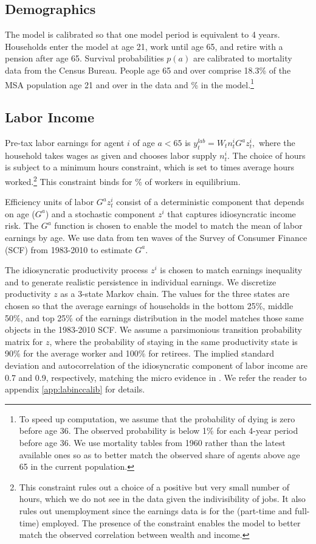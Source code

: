 \documentclass[letterpaper,12pt,dvipsnames,usenames]{article}
\theoremstyle{definition}
\begin{document}
\begin{spacing}{1.25}
\subsection{Demographics}
The model is calibrated so that one model period is equivalent to 4 years. Households enter the model at age 21, work until age 65, and retire with a pension after age 65. Survival probabilities $p(a)$ are calibrated to mortality data from the Census Bureau. People  age 65 and over comprise 18.3\% of the MSA population age 21 and over in the data and {\fracRet}\% in the model.\footnote{To speed up computation, we assume that the probability of dying is zero before age 36. The observed probability is below 1\% for each 4-year period before age 36. We use mortality tables from 1960 rather than the latest available ones so as to better match the observed share of agents above age 65 in the current population.}

\subsection{Labor Income}

Pre-tax labor earnings for agent $i$ of age $a<65$ is $y_t^{lab}= W_t n_t^i G^a z_t^i,$ where the household takes wages as given and chooses labor supply $n_t^i$. The choice of hours is subject to a minimum hours constraint, which is set to  {\HoursMinbyHours} times average hours worked.\footnote{This constraint rules out a choice of a positive but very small number of hours, which we do not see in the data given the indivisibility of jobs. It also rules out unemployment since the earnings data is for the (part-time and full-time) employed. The presence of the constraint enables the model to better match the observed correlation between wealth and income.} This constraint binds for {\HoursMinBind}\% of workers in equilibrium.


Efficiency units of labor $G^a z_t^i$ consist of a deterministic component that depends on age ($G^a$) and a stochastic component $z^i$ that captures idiosyncratic income risk. The $G^{a}$ function is chosen to enable the model to match the mean of labor earnings by age. We use data from ten waves of the Survey of Consumer Finance (SCF) from 1983-2010 to estimate $G^a$.

The idiosyncratic productivity process $z^i$ is chosen to match earnings inequality and to generate realistic persistence in individual earnings. We discretize productivity $z$ as a 3-state Markov chain. The values for the three states are chosen so that the average earnings of households in the bottom 25\%, middle 50\%, and top 25\% of the earnings distribution in the model matches those same objects in the 1983-2010 SCF. We assume a parsimonious transition probability matrix for $z$, where the probability of staying in the same productivity state is 90\% for the average worker and 100\% for retirees. The implied standard deviation and autocorrelation of the idiosyncratic component of labor income are 0.7 and 0.9, respectively, matching the micro evidence in \citet{StoreslettenTelmerYaron2006}. We refer the reader to appendix \ref{app:labinccalib} for details.


\end{spacing}
\end{document}
